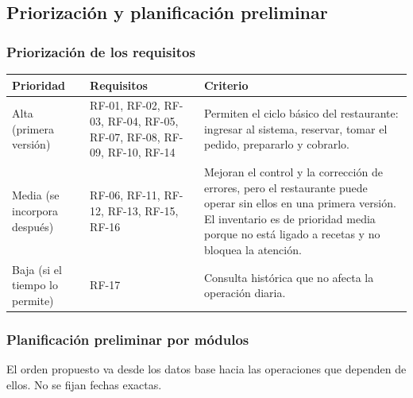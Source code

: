 \documentclass[12pt,a4paper,oneside]{article}
\begin{document}
\subsection{Priorización y planificación preliminar}

\subsubsection{Priorización de los requisitos}

{\small\renewcommand{\arraystretch}{1.2}
\begin{longtable}{P{2.2cm}P{5.0cm}P{6.8cm}}
\toprule
\textbf{Prioridad} & \textbf{Requisitos} & \textbf{Criterio} \\ \midrule
\endhead
Alta (primera versión) & RF-01, RF-02, RF-03, RF-04, RF-05, RF-07, RF-08, RF-09, RF-10, RF-14 & Permiten el ciclo básico del restaurante: ingresar al sistema, reservar, tomar el pedido, prepararlo y cobrarlo. \\ \midrule
Media (se incorpora después) & RF-06, RF-11, RF-12, RF-13, RF-15, RF-16 & Mejoran el control y la corrección de errores, pero el restaurante puede operar sin ellos en una primera versión. El inventario es de prioridad media porque no está ligado a recetas y no bloquea la atención. \\ \midrule
Baja (si el tiempo lo permite) & RF-17 & Consulta histórica que no afecta la operación diaria. \\ \bottomrule
\end{longtable}}

\subsubsection{Planificación preliminar por módulos}

El orden propuesto va desde los datos base hacia las operaciones que dependen de ellos. No se fijan fechas exactas.
\end{document}
